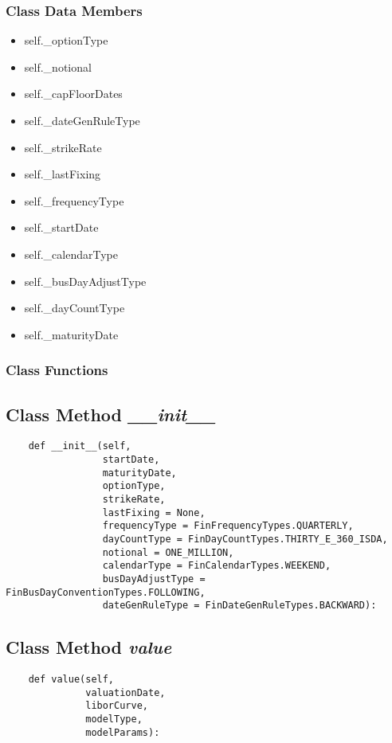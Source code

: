 \documentclass[twoside,11pt]{book}
\begin{document}
\subsubsection{Class Data Members}
\begin{itemize}
\item{self.\_optionType}
\item{self.\_notional}
\item{self.\_capFloorDates}
\item{self.\_dateGenRuleType}
\item{self.\_strikeRate}
\item{self.\_lastFixing}
\item{self.\_frequencyType}
\item{self.\_startDate}
\item{self.\_calendarType}
\item{self.\_busDayAdjustType}
\item{self.\_dayCountType}
\item{self.\_maturityDate}
\end{itemize}

\subsubsection{Class Functions}

\subsection{Class Method {\it \_\_init\_\_}}


\begin{lstlisting}
    def __init__(self, 
                 startDate,
                 maturityDate,
                 optionType,
                 strikeRate,
                 lastFixing = None,
                 frequencyType = FinFrequencyTypes.QUARTERLY,
                 dayCountType = FinDayCountTypes.THIRTY_E_360_ISDA,
                 notional = ONE_MILLION, 
                 calendarType = FinCalendarTypes.WEEKEND,
                 busDayAdjustType = FinBusDayConventionTypes.FOLLOWING,
                 dateGenRuleType = FinDateGenRuleTypes.BACKWARD):
\end{lstlisting}

\subsection{Class Method {\it value}}


\begin{lstlisting}
    def value(self, 
              valuationDate,
              liborCurve, 
              modelType, 
              modelParams):
\end{lstlisting}
\end{document}

